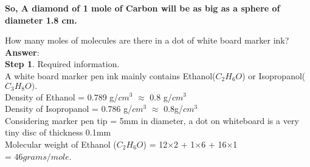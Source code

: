 \documentclass[11pt]{exam}
\begin{document}
\begin{questions}
 \textbf{So, A diamond of 1 mole of Carbon will be as big as a sphere of diameter 1.8 cm.} \\ 

                    
\question
\label{Q7: A dot of ink}

How many moles of molecules are there in a dot of white board marker ink? \\
\textbf{Answer}: \\
\textbf{Step 1}. Required information. \\
A white board marker pen ink mainly contains Ethanol($C_{2}H_{6}O$) or Isopropanol($C_{3}H_{8}O).$ \\
Density of Ethanol = 0.789 g/$cm^{3}$ $\approx$ 0.8 g/$cm^{3}$\\
Density of Isopropanol = 0.786 g/$cm^{3}$ $\approx$ 0.8g/$cm^{3}$\\
Considering marker pen tip = 5mm in diameter, a dot on whiteboard is a very tiny disc of thickness 0.1mm\\
Molecular weight of Ethanol ($C_{2}H_{6}O$) = 12$\times$2 + 1$\times$6 + 16$\times$1 \\
 = $46 grams/mole.$ \\ 

 \\  


\end{questions}
\end{document}
